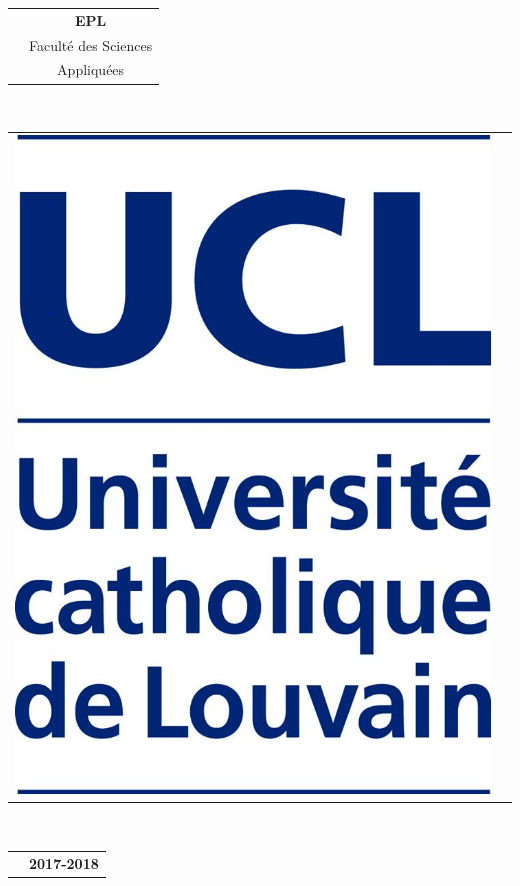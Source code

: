 \documentclass{article}
\theoremstyle{definition}
\newcommand{\dateb}{2017-2018}
\begin{document}
\begin{titlepage}
	\begin{minipage}[h]{0.5\textwidth}
		\begin{flushright}
			\begin{tabular}{p{0cm} c}
				& {\Huge {\bf EPL}} \\
				& {\huge Faculté des Sciences}\\
				 &{\huge Appliquées}
			\end{tabular}\\
		\end{flushright}
	\end{minipage}
	\begin{minipage}[h]{0.3\textwidth}
		\begin{flushright}
			\begin{tabular}{p{10cm} c}
\includegraphics[scale=0.1]{UCL_logo} 
			\end{tabular}\\
		\end{flushright}
	\end{minipage}
	
	\vspace{10mm}
	
	\begin{tabular}{p{7cm} c}
		& {\huge \bf \dateb} \\
	\end{tabular}\\
	
\end{titlepage}
\end{document}
